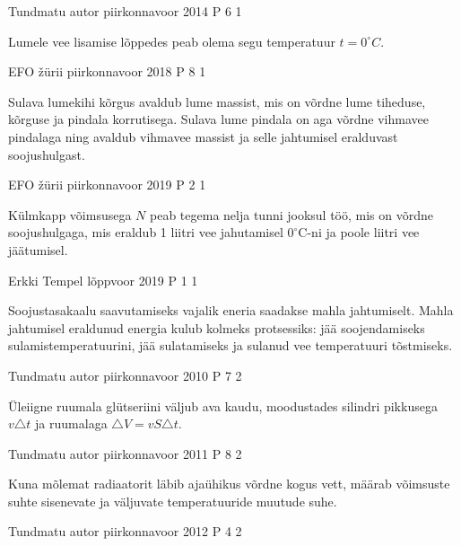 \documentclass[11pt]{article}
\begin{document}
{%
{Tundmatu autor} %
{piirkonnavoor} %
{2014} %
{P 6} %
{1} %
{

\ifHint
Lumele vee lisamise lõppedes peab olema segu temperatuur $t = 0^{\circ}C$.
\fi
}

{EFO žürii} %
{piirkonnavoor} %
{2018} %
{P 8} %
{1} %
{

\ifHint
Sulava lumekihi kõrgus avaldub lume massist, mis on võrdne lume tiheduse, kõrguse ja pindala korrutisega. Sulava lume pindala on aga võrdne vihmavee pindalaga ning avaldub vihmavee massist ja selle jahtumisel eralduvast soojushulgast.
\fi
}

{EFO žürii} %
{piirkonnavoor} %
{2019} %
{P 2} %
{1} %
{

\ifHint
Külmkapp võimsusega $N$ peab tegema nelja tunni jooksul töö, mis on võrdne soojushulgaga, mis eraldub 1 liitri vee jahutamisel $ 0^{\circ}$C-ni ja poole liitri vee jäätumisel.
\fi
}

{Erkki Tempel} %
{lõppvoor} %
{2019} %
{P 1} %
{1} %
{

\ifHint
Soojustasakaalu saavutamiseks vajalik eneria saadakse mahla jahtumiselt. Mahla jahtumisel eraldunud energia kulub kolmeks protsessiks: jää soojendamiseks sulamistemperatuurini, jää sulatamiseks ja sulanud vee temperatuuri tõstmiseks.
\fi
}

{Tundmatu autor} %
{piirkonnavoor} %
{2010} %
{P 7} %
{2} %
{

\ifHint
Üleiigne ruumala glütseriini väljub ava kaudu, moodustades silindri pikkusega $v \triangle t$ ja ruumalaga $\triangle V = v S \triangle t$.
\fi
}

{Tundmatu autor} %
{piirkonnavoor} %
{2011} %
{P 8} %
{2} %
{

\ifHint
Kuna mõlemat radiaatorit läbib ajaühikus võrdne kogus vett, määrab võimsuste suhte sisenevate ja väljuvate temperatuuride muutude suhe.
\fi
}

{Tundmatu autor} %
{piirkonnavoor} %
{2012} %
{P 4} %
{2} %
{

}}
\end{document}
